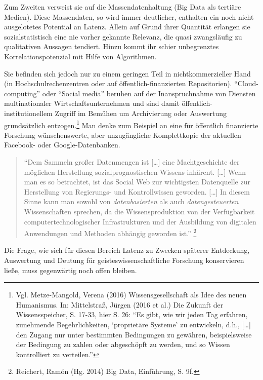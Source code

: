 \documentclass[a4paper,
fontsize=11pt,
oneside,
numbers=noperiodatend,
parskip=half-,
bibliography=totoc,
final
]{scrartcl}
\begin{document}
Zum Zweiten verweist sie auf die Massendatenhaltung (Big Data als
tertiäre Medien). Diese Massendaten, so wird immer deutlicher, enthalten
ein noch nicht ausgelotetes Potential an Latenz. Allein auf Grund ihrer
Quantität erlangen sie sozialstatistisch eine nie vorher gekannte
Relevanz, die quasi zwangsläufig zu qualitativen Aussagen tendiert.
Hinzu kommt ihr schier unbegrenztes Korrelationspotenzial mit Hilfe von
Algorithmen.

Sie befinden sich jedoch nur zu einem geringen Teil in
nichtkommerzieller Hand (in Hochschulrechenzentren oder auf
öffentlich-finanzierten Repositorien). \enquote{Cloud-computing} oder
\enquote{Social media} beruhen auf der Inanspruchnahme von Diensten
multinationaler Wirtschaftsunternehmen und sind damit
öffentlich-institutionellem Zugriff im Bemühen um Archivierung oder
Auswertung grundsätzlich entzogen.\footnote{Vgl. Metze-Mangold, Verena
  (2016) Wissensgesellschaft als Idee des neuen Humanismus. In:
  Mittelstraß, Jürgen (2016 et al.) Die Zukunft der Wissensspeicher, S.
  17-33, hier S. 26: \enquote{Es gibt, wie wir jeden Tag erfahren,
  zunehmende Begehrlichkeiten, \enquote{proprietäre Systeme} zu
  entwickeln, d.h., {[}\ldots{}{]} den Zugang nur unter bestimmten
  Bedingungen zu gewähren, beispielsweise der Bedingung zu zahlen oder
  abgeschöpft zu werden, und so Wissen kontrolliert zu verteilen.}} Man
denke zum Beispiel an eine für öffentlich finanzierte Forschung
wünschenswerte, aber unzugängliche Komplettkopie der aktuellen Facebook-
oder Google-Datenbanken.

\begin{quote}
\enquote{Dem Sammeln großer Datenmengen ist {[}\ldots{}{]} eine
Machtgeschichte der möglichen Herstellung sozialprognostischen Wissens
inhärent. {[}\ldots{}{]} Wenn man es so betrachtet, ist das Social Web
zur wichtigsten Datenquelle zur Herstellung von Regierungs- und
Kontrollwissen geworden. {[}\ldots{}{]} In diesem Sinne kann man sowohl
von \emph{datenbasierten} als auch \emph{datengesteuerten}
Wissenschaften sprechen, da die Wissensproduktion von der Verfügbarkeit
computertechnologischer Infrastrukturen und der Ausbildung von digitalen
Anwendungen und Methoden abhängig geworden ist.} \footnote{Reichert,
  Ramón (Hg. 2014) Big Data, Einführung, S. 9f.}
\end{quote}

Die Frage, wie sich für diesen Bereich Latenz zu Zwecken späterer
Entdeckung, Auswertung und Deutung für geisteswissenschaftliche
Forschung konservieren ließe, muss gegenwärtig noch offen bleiben.
\end{document}

